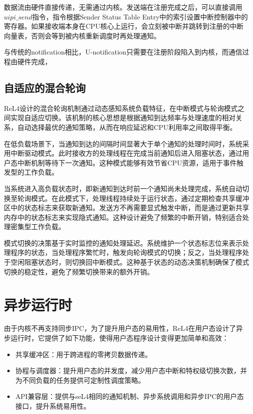 数据流由硬件直接传递，无需通过内核。发送端在注册完成之后，可以直接调用$uipi\_send$指令，指令根据Sender Status Table Entry中的索引设置中断控制器中的寄存器。如果接收端本身在CPU核心上运行，会立刻被中断并跳转到注册的中断向量表，否则会等到被内核重新调度时再处理通知。

与传统的notification相比，U-notification只需要在注册阶段陷入到内核，而通信过程由硬件完成，

\subsection{自适应的混合轮询}

ReL4设计的混合轮询机制通过动态感知系统负载特征，在中断模式与轮询模式之间实现自适应切换。该机制的核心思想是根据通知到达频率与处理速度的相对关系，自动选择最优的通知策略，从而在响应延迟和CPU利用率之间取得平衡。

在低负载场景下，当通知到达的间隔时间显著大于单个通知的处理时间时，系统采用中断驱动模式。此时接收方的处理线程在完成当前通知后进入阻塞状态，通过用户态中断机制等待下一次通知。这种模式能够有效节省CPU资源，适用于事件触发型的工作负载。

当系统进入高负载状态时，即新通知到达时前一个通知尚未处理完成，系统自动切换至轮询模式。在此模式下，处理线程持续处于运行状态，通过定期检查共享缓冲区中的状态标志来获取新通知。发送方不再需要显式触发中断，而是通过更新共享内存中的状态标志来实现隐式通知。这种设计避免了频繁的中断开销，特别适合处理密集型工作负载。

模式切换的决策基于实时监控的通知处理延迟。系统维护一个状态标志位来表示处理程序的状态，当处理程序繁忙时，触发向轮询模式的切换；反之，当处理程序处于空闲阻塞状态时，则切换回中断模式。这种基于状态的动态决策机制确保了模式切换的稳定性，避免了频繁切换带来的额外开销。

\section{异步运行时}
由于内核不再支持同步IPC，为了提升用户态的易用性，ReL4在用户态设计了异步运行时，它提供了如下功能，使得用户态程序设计变得更加简单和高效：
\begin{itemize}
  \item 共享缓冲区：用于跨进程的零拷贝数据传递。
  \item 协程与调度器：提升用户态的并发度，减少用户态中断和特权级切换次数，并为不同负载的任务提供可定制性调度策略。
  \item API兼容层：提供与seL4相同的通知机制、异步系统调用和异步IPC的用户态接口，提升系统易用性。
\end{itemize}

